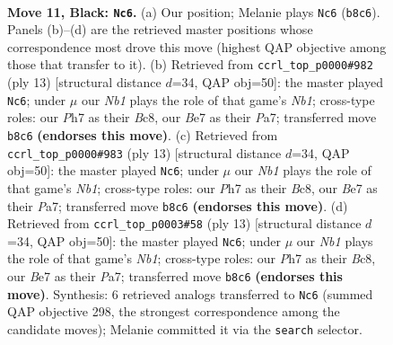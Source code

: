 \documentclass[11pt]{article}
\begin{document}
\clearpage

\begin{figure}[p]\centering
\begin{subfigure}{0.46\textwidth}\centering
\resizebox{\linewidth}{!}{%
\newchessgame
\chessboard[
  setfen={1nbq1rk1/1p2bp1p/r4np1/p1pp4/P2P4/1P2PNP1/5PBP/RNBQ1RK1 b - - 0 11},
  showmover=false,
  pgfstyle=straightmove, color=movearrow, markmove={b8-c6}
]}
\caption{}
\end{subfigure}\hfill
\begin{subfigure}{0.46\textwidth}\centering
\resizebox{\linewidth}{!}{%
\newchessgame
\chessboard[
  setfen={rnbq1rk1/ppp1b1pp/4pn2/3p1p2/2PP4/1P3NP1/P3PPBP/RNBQ1RK1 b - - 0 7},
  showmover=false,
  pgfstyle=straightmove, color=movearrow, markmove={b8-c6}
]}
\caption{}
\end{subfigure}
\\[4pt]
\begin{subfigure}{0.46\textwidth}\centering
\resizebox{\linewidth}{!}{%
\newchessgame
\chessboard[
  setfen={rnbq1rk1/ppp1b1pp/4pn2/3p1p2/2PP4/1P3NP1/P3PPBP/RNBQ1RK1 b - - 0 7},
  showmover=false,
  pgfstyle=straightmove, color=movearrow, markmove={b8-c6}
]}
\caption{}
\end{subfigure}\hfill
\begin{subfigure}{0.46\textwidth}\centering
\resizebox{\linewidth}{!}{%
\newchessgame
\chessboard[
  setfen={rnbq1rk1/ppp1b1pp/4pn2/3p1p2/2PP4/1P3NP1/P3PPBP/RNBQ1RK1 b - - 0 7},
  showmover=false,
  pgfstyle=straightmove, color=movearrow, markmove={b8-c6}
]}
\caption{}
\end{subfigure}
\caption{\textbf{Move 11, Black: \texttt{Nc6}.} (a) Our position; Melanie plays \texttt{Nc6} (\texttt{b8c6}). Panels (b)--(d) are the retrieved master positions whose correspondence most drove this move (highest QAP objective among those that transfer to it). (b) Retrieved from \texttt{ccrl\_top\_p0000\#982} (ply 13) [structural distance $d$=34, QAP obj=50]: the master played \texttt{Nc6}; under $\mu$ our \emph{Nb1} plays the role of that game's \emph{Nb1}; cross-type roles: our \emph{P}h7 as their \emph{B}c8, our \emph{B}e7 as their \emph{P}a7; transferred move \texttt{b8c6} \textbf{(endorses this move)}. (c) Retrieved from \texttt{ccrl\_top\_p0000\#983} (ply 13) [structural distance $d$=34, QAP obj=50]: the master played \texttt{Nc6}; under $\mu$ our \emph{Nb1} plays the role of that game's \emph{Nb1}; cross-type roles: our \emph{P}h7 as their \emph{B}c8, our \emph{B}e7 as their \emph{P}a7; transferred move \texttt{b8c6} \textbf{(endorses this move)}. (d) Retrieved from \texttt{ccrl\_top\_p0003\#58} (ply 13) [structural distance $d$=34, QAP obj=50]: the master played \texttt{Nc6}; under $\mu$ our \emph{Nb1} plays the role of that game's \emph{Nb1}; cross-type roles: our \emph{P}h7 as their \emph{B}c8, our \emph{B}e7 as their \emph{P}a7; transferred move \texttt{b8c6} \textbf{(endorses this move)}. Synthesis: 6 retrieved analogs transferred to \texttt{Nc6} (summed QAP objective 298, the strongest correspondence among the candidate moves); Melanie committed it via the \texttt{search} selector.}
\label{fig:thought-m21}
\end{figure}
\end{document}
